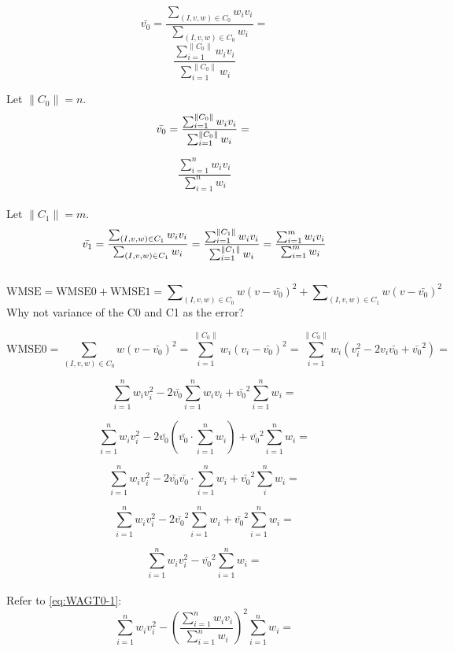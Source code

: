 \documentclass[a4paper,12pt]{article}
\begin{document}
\begin{equation}
\label{eq:WAGT0}
\bar{v_0}=\frac{\sum\nolimits_{(I,v,w) \in C_0} w_i v_i} { \sum\nolimits_{(I,v,w) \in C_0} w_i} =
\end{equation}
\[
\frac{\sum_{i=1}^{\| C_0 \|}  w_i v_i}
{\sum_{i=1}^{\| C_0 \|}  w_i}
\]

Let $\| C_{0} \|=n$.\\
\[
\bar{v_0}=\frac{\sum_{i=1}^{\| C_0 \|}  w_i v_i}
{\sum_{i=1}^{\| C_0 \|}  w_i}=\\
\]

\begin{equation}
\label{eq:WAGT0-1}
\frac{\sum_{i=1}^{n}  w_i v_i}
{\sum_{i=1}^{n}  w_i}
\end{equation}
\\

Let $\| C_{1} \|=m$.\\
\begin{equation}
\label{eq:WAGT1}
\bar{v_1}=\frac{\sum\nolimits_{(I,v,w) \in C_1} w_i v_i} { \sum\nolimits_{(I,v,w) \in C_1} w_i} =
\frac{\sum_{i=1}^{\| C_1 \|}  w_i v_i}
{\sum_{i=1}^{\| C_1 \|}  w_i}=\\
\frac{\sum_{i=1}^{m}  w_i v_i}
{\sum_{i=1}^{m}  w_i}
\end{equation}
\\

\begin{equation}
\label{eq:WMSE}
\text{WMSE}=\text{WMSE0} + \text{WMSE1}=
\sum\nolimits_{(I,v,w) \in C_0} w (v-\bar{v_0})^2 +
\sum\nolimits_{(I,v,w) \in C_1} w (v-\bar{v_0})^2
\end{equation}
Why not variance of the C0 and C1 as the error?

\[\text{WMSE0}=\sum_{(I,v,w) \in C_0} w (v-\bar{v_0})^2=\sum_{i=1}^{\| C_0 \|} w_i (v_i - \bar{v_0})^2=
\sum_{i=1}^{\| C_0 \|} w_i (v_i^2 - 2v_i \bar{v_0} + \bar{v_0}^2)=\]

\[\sum_{i=1}^{n} w_i v_i^2 - 2\bar{v_0}\sum_{i=1}^{n} w_i v_i +
\bar{v_0}^2\sum_{i=1}^{n} w_i=\]

\[\sum_{i=1}^{n} w_i v_i^2 - 2\bar{v_0} (\bar{v_0} \cdot \sum_{i=1}^n w_i) +
\bar{v_0}^2\sum_{i=1}^{n} w_i=\]

\[\sum_{i=1}^{n} w_i v_i^2 - 2\bar{v_0} \bar{v_0} \cdot \sum_{i=1}^n w_i
+ \bar{v_0}^2\sum_i^n w_i=\]

\[\sum_{i=1}^{n} w_i v_i^2 - 2\bar{v_0}^2 \sum_{i=1}^n w_i  +
\bar{v_0}^2 \sum_{i=1}^n w_i=\]

\[\sum_{i=1}^{n} w_i v_i^2 - \bar{v_0}^2 \sum_{i=1}^n w_i = \]
\\
Refer to \eqref{eq:WAGT0-1}:
\[\sum_{i=1}^{n} w_i v_i^2 - (\frac{\sum_{i=1}^{n}  w_i v_i}
{\sum_{i=1}^{n}  w_i})^2 \sum_{i=1}^n w_i = \]
\end{document}
